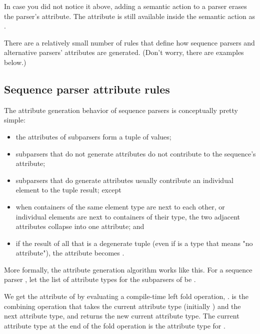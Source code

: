 \documentclass{MyBook}
\begin{document}
\begin{marker}[title=Important ]
In case you did not notice it above, adding a semantic action to a parser erases the parser's attribute. The attribute is still available inside the semantic action as . 
\end{marker}

There are a relatively small number of rules that define how sequence parsers and alternative parsers'{} attributes are generated. (Don't worry, there are examples below.)

\subsection{Sequence parser attribute rules}

The attribute generation behavior of sequence parsers is conceptually pretty simple:

\begin{itemize}
\item
  the attributes of subparsers form a tuple of values;
\item
  subparsers that do not generate attributes do not contribute to the sequence's attribute;
\item
  subparsers that do generate attributes usually contribute an individual element to the tuple result; except
\item
  when containers of the same element type are next to each other, or individual elements are next to containers of their type, the two adjacent attributes collapse into one attribute; and
\item
  if the result of all that is a degenerate tuple  (even if  is a type that means "no attribute"), the attribute becomes .
\end{itemize}

More formally, the attribute generation algorithm works like this. For a sequence parser , let the list of attribute types for the subparsers of  be .

We get the attribute of  by evaluating a compile-time left fold operation, .  is the combining operation that takes the current attribute type (initially ) and the next attribute type, and returns the new current attribute type. The current attribute type at the end of the fold operation is the attribute type for .
\end{document}
